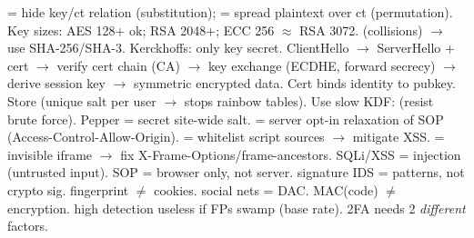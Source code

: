  = hide key/ct relation (substitution);  = spread plaintext over ct (permutation). Key sizes: AES 128+ ok; RSA 2048+; ECC 256 $\approx$ RSA 3072.  (collisions) $\to$ use SHA-256/SHA-3. Kerckhoffs: only key secret.
ClientHello $\to$ ServerHello + cert $\to$ verify cert chain (CA) $\to$ key exchange (ECDHE, forward secrecy) $\to$ derive session key $\to$ symmetric encrypted data. Cert binds identity to pubkey.
 Store  (unique salt per user $\to$ stops rainbow tables). Use slow KDF:  (resist brute force). Pepper = secret site-wide salt.
 = server opt-in relaxation of SOP (Access-Control-Allow-Origin).  = whitelist script sources $\to$ mitigate XSS.  = invisible iframe $\to$ fix X-Frame-Options/frame-ancestors. SQLi/XSS = injection (untrusted input).
SOP = browser only, not server. signature IDS = patterns, not crypto sig. fingerprint $\ne$ cookies. social nets = DAC. MAC(code) $\ne$ encryption. high detection useless if FPs swamp (base rate). 2FA needs 2 \emph{different} factors.
